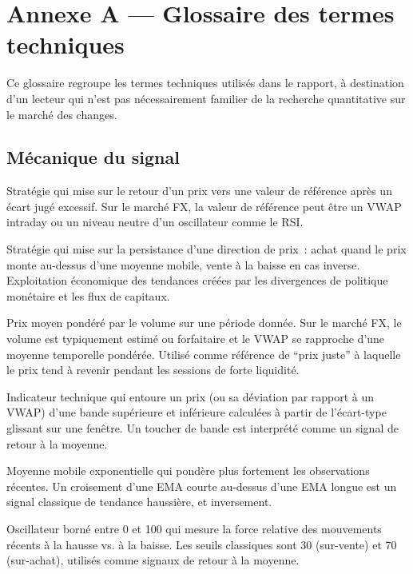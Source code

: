 \section{Annexe A --- Glossaire des termes techniques}
\label{app:glossary}

Ce glossaire regroupe les termes techniques utilisés dans le rapport, à destination d'un lecteur qui n'est pas nécessairement familier de la recherche quantitative sur le marché des changes.

\subsection*{Mécanique du signal}

\begin{description}[style=nextline, leftmargin=0.5cm, itemsep=0.4em]
\item[\textbf{Mean reversion} (retour à la moyenne)] Stratégie qui mise sur le retour d'un prix vers une valeur de référence après un écart jugé excessif. Sur le marché FX, la valeur de référence peut être un VWAP intraday ou un niveau neutre d'un oscillateur comme le RSI.

\item[\textbf{Momentum} (suivi de tendance)] Stratégie qui mise sur la persistance d'une direction de prix~: achat quand le prix monte au-dessus d'une moyenne mobile, vente à la baisse en cas inverse. Exploitation économique des tendances créées par les divergences de politique monétaire et les flux de capitaux.

\item[\textbf{VWAP} (Volume-Weighted Average Price)] Prix moyen pondéré par le volume sur une période donnée. Sur le marché FX, le volume est typiquement estimé ou forfaitaire et le VWAP se rapproche d'une moyenne temporelle pondérée. Utilisé comme référence de \enquote{prix juste} à laquelle le prix tend à revenir pendant les sessions de forte liquidité.

\item[\textbf{Bollinger Bands} (bandes de Bollinger)] Indicateur technique qui entoure un prix (ou sa déviation par rapport à un VWAP) d'une bande supérieure et inférieure calculées à partir de l'écart-type glissant sur une fenêtre. Un toucher de bande est interprété comme un signal de retour à la moyenne.

\item[\textbf{EMA} (Exponential Moving Average)] Moyenne mobile exponentielle qui pondère plus fortement les observations récentes. Un croisement d'une EMA courte au-dessus d'une EMA longue est un signal classique de tendance haussière, et inversement.

\item[\textbf{RSI} (Relative Strength Index)] Oscillateur borné entre 0 et 100 qui mesure la force relative des mouvements récents à la hausse vs. à la baisse. Les seuils classiques sont 30 (sur-vente) et 70 (sur-achat), utilisés comme signaux de retour à la moyenne.
\end{description}

